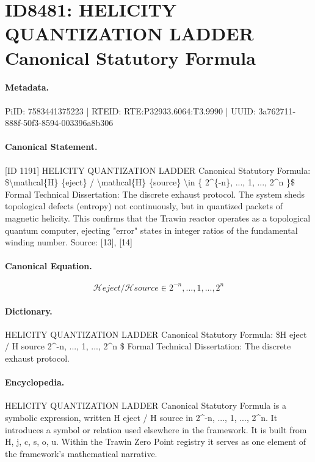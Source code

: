 \section*{ID8481: HELICITY QUANTIZATION LADDER Canonical Statutory Formula}
\paragraph{Metadata.}
PiID: 7583441375223 | RTEID: RTE:P32933.6064:T3.9990 | UUID: 3a762711-888f-50f3-8594-003396a8b306

\paragraph{Canonical Statement.}
[ID 1191] HELICITY QUANTIZATION LADDER Canonical Statutory Formula: \$\textbackslash{}mathcal\{H\} \{eject\} / \textbackslash{}mathcal\{H\} \{source\} \textbackslash{}in \{ 2\textasciicircum{}\{-n\}, ..., 1, ..., 2\textasciicircum{}n \}\$ Formal Technical Dissertation: The discrete exhaust protocol. The system sheds topological defects (entropy) not continuously, but in quantized packets of magnetic helicity. This confirms that the Trawin reactor operates as a topological quantum computer, ejecting "error" states in integer ratios of the fundamental winding number. Source: [13], [14]

\paragraph{Canonical Equation.}
\[
\mathcal{H} {eject} / \mathcal{H} {source} \in { 2^{-n}, ..., 1, ..., 2^n }
\]

\paragraph{Dictionary.}
HELICITY QUANTIZATION LADDER Canonical Statutory Formula: \$H eject / H source 2\textasciicircum{}-n, ..., 1, ..., 2\textasciicircum{}n \$ Formal Technical Dissertation: The discrete exhaust protocol.

\paragraph{Encyclopedia.}
HELICITY QUANTIZATION LADDER Canonical Statutory Formula is a symbolic expression, written H eject / H source in 2\textasciicircum{}-n, ..., 1, ..., 2\textasciicircum{}n. It introduces a symbol or relation used elsewhere in the framework. It is built from H, j, c, s, o, u. Within the Trawin Zero Point registry it serves as one element of the framework's mathematical narrative.
